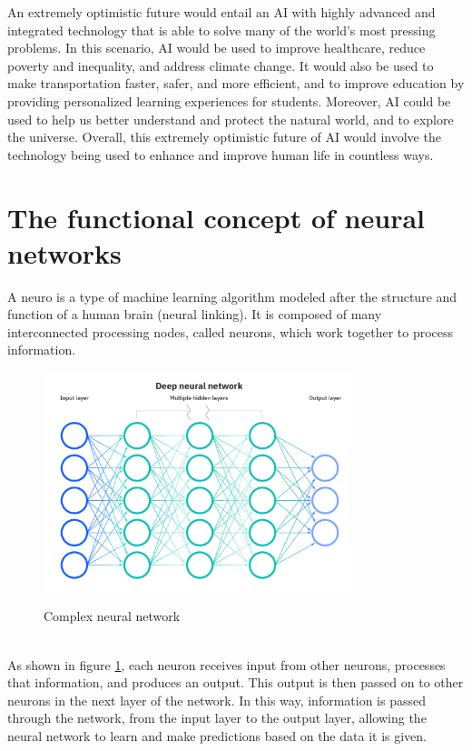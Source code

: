 An extremely optimistic future would entail an AI with highly advanced and 
integrated technology that is able to solve many of the world's most pressing 
problems. In this scenario, AI would be used to improve healthcare, reduce poverty 
and inequality, and address climate change. It would also be used to make transportation 
faster, safer, and more efficient, and to improve education by providing personalized learning 
experiences for students. Moreover, AI could be used to help us better understand and protect the 
natural world, and to explore the universe. Overall, this extremely optimistic future of AI would 
involve the technology being used to enhance and improve human life in countless ways.



\section{The functional concept of neural networks}
A \gls{neuro} is a type of machine learning algorithm modeled 
after the structure and function of a human brain (neural linking). 
It is composed of many interconnected processing nodes, called neurons, 
which work together to process information. 
\\
\begin{figure}[htb]
    \centering
    \includegraphics[width=0.8\textwidth]{pics/neuralnetwork.jpg}
    \caption{Complex neural network}
    \label{fig:neuralnetwork}
    \cite{IBM}
\end{figure}
\\
As shown in figure \ref{fig:neuralnetwork}, each neuron receives input from other neurons, processes that information, 
and produces an output. This output is then passed on to other neurons in the next 
layer of the network. In this way, information is passed through the network, from the 
input layer to the output layer, allowing the neural network to learn and make predictions
based on the data it is given. \cite{book1}

